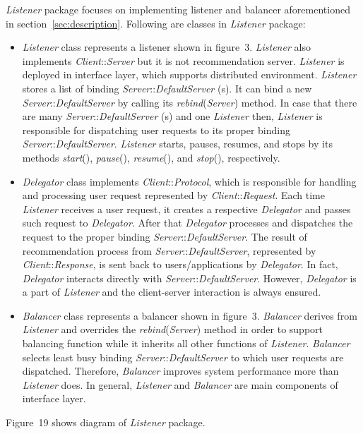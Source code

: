 \documentclass[a4paper]{llncs}
\begin{document}
\textit{Listener} package focuses on implementing listener and balancer aforementioned in section~\ref{sec:description}. Following are classes in \textit{Listener} package:
\begin{itemize}
\item \textit{Listener} class represents a listener shown in figure~3. \textit{Listener} also implements \textit{Client}::\textit{Server} but it is not recommendation server. \textit{Listener} is deployed in interface layer, which supports distributed environment. \textit{Listener} stores a list of binding \textit{Server}::\textit{DefaultServer} (s). It can bind a new \textit{Server}::\textit{DefaultServer} by calling its \textit{rebind}(\textit{Server}) method. In case that there are many \textit{Server}::\textit{DefaultServer} (s) and one \textit{Listener} then, \textit{Listener} is responsible for dispatching user requests to its proper binding \textit{Server}::\textit{DefaultServer}. \textit{Listener} starts, pauses, resumes, and stops by its methods \textit{start}(), \textit{pause}(), \textit{resume}(), and \textit{stop}(), respectively.

\item \textit{Delegator} class implements \textit{Client}::\textit{Protocol}, which is responsible for handling and processing user request represented by \textit{Client}::\textit{Request}. Each time \textit{Listener} receives a user request, it creates a respective \textit{Delegator} and passes such request to \textit{Delegator}. After that \textit{Delegator} processes and dispatches the request to the proper binding \textit{Server}::\textit{DefaultServer}. The result of recommendation process from \textit{Server}::\textit{DefaultServer}, represented by \textit{Client}::\textit{Response}, is sent back to users/applications by \textit{Delegator}. In fact, \textit{Delegator} interacts directly with \textit{Server}::\textit{DefaultServer}. However, \textit{Delegator} is a part of \textit{Listener} and the client-server interaction is always ensured.

\item \textit{Balancer} class represents a balancer shown in figure~3. \textit{Balancer} derives from \textit{Listener} and overrides the \textit{rebind}(\textit{Server}) method in order to support balancing function while it inherits all other functions of \textit{Listener}. \textit{Balancer} selects least busy binding \textit{Server}::\textit{DefaultServer} to which user requests are dispatched. Therefore, \textit{Balancer} improves system performance more than \textit{Listener} does. In general, \textit{Listener} and \textit{Balancer} are main components of interface layer.
\end{itemize}
Figure~19 shows diagram of \textit{Listener} package.
\end{document}

